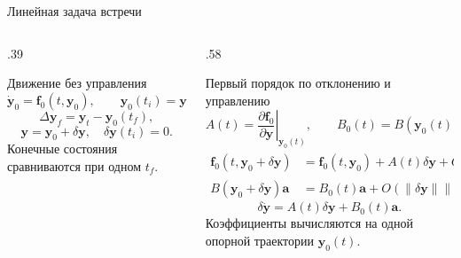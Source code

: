 \documentclass[11pt,aspectratio=169,t]{beamer}
\newcommand{\eqcompact}{\fontsize{10}{12}\selectfont}
\newcommand{\derivationmathspacing}{%
  \setlength{\abovedisplayskip}{2pt}%
  \setlength{\belowdisplayskip}{3pt}%
  \setlength{\abovedisplayshortskip}{2pt}%
  \setlength{\belowdisplayshortskip}{2pt}%
  \setlength{\jot}{2pt}}
\newcommand{\vect}[1]{\boldsymbol{#1}}
\begin{document}
\begin{frame}{Линейная задача встречи}
\relax
\derivationmathspacing
\begin{columns}[T,onlytextwidth]
\begin{column}{.39\textwidth}
\begin{block}{Движение без управления}
{\eqcompact\derivationmathspacing
\[
 \dot{\vect y}_0=\vect f_0(t,\vect y_0),\qquad
 \vect y_0(t_i)=\vect y_i,
\]
\[
 \Delta\vect y_f=\vect y_t-\vect y_0(t_f),
\]
\[
 \vect y=\vect y_0+\delta\vect y,\quad
 \delta\vect y(t_i)=0.
\]
}
Конечные состояния сравниваются при одном $t_f$.
\end{block}
\end{column}
\begin{column}{.58\textwidth}
\begin{block}{Первый порядок по отклонению и управлению}
{\eqcompact\derivationmathspacing
\[
 A(t)=\left.\frac{\partial\vect f_0}{\partial\vect y}
                   \right|_{\vect y_0(t)},\qquad
 B_0(t)=B(\vect y_0(t)),
\]
\[
 \begin{aligned}
 \vect f_0(t,\vect y_0+\delta\vect y)
 &=\vect f_0(t,\vect y_0)+A(t)\delta\vect y
       +O(\|\delta\vect y\|^2),\\
 B(\vect y_0+\delta\vect y)\vect a
 &=B_0(t)\vect a+O(\|\delta\vect y\|\|\vect a\|),
 \end{aligned}
\]
\[
 \boxed{\delta\dot{\vect y}=A(t)\delta\vect y+B_0(t)\vect a.}
\]
}
Коэффициенты вычисляются на одной опорной траектории $\vect y_0(t)$.
\end{block}
\end{column}
\end{columns}
\end{frame}
\end{document}
